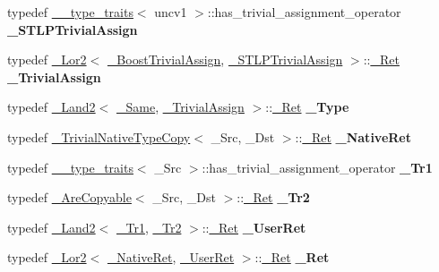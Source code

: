 \begin{DoxyCompactItemize}
typedef \hyperlink{struct____type__traits}{\+\_\+\+\_\+type\+\_\+traits}$<$ uncv1 $>$\+::has\+\_\+trivial\+\_\+assignment\+\_\+operator {\bfseries \+\_\+\+S\+T\+L\+P\+Trivial\+Assign}
\item 
\mbox{\label{struct___trivial_copy_abb68b8d834c50eb203aee02115c37900}} 
typedef \hyperlink{struct___lor2}{\+\_\+\+Lor2}$<$ \hyperlink{struct____true__type}{\+\_\+\+Boost\+Trivial\+Assign}, \hyperlink{struct____true__type}{\+\_\+\+S\+T\+L\+P\+Trivial\+Assign} $>$\+::\hyperlink{struct____true__type}{\+\_\+\+Ret} {\bfseries \+\_\+\+Trivial\+Assign}
\item 
\mbox{\label{struct___trivial_copy_a6498a805c926a4de0faeb5d1ac150d54}} 
typedef \hyperlink{struct___land2}{\+\_\+\+Land2}$<$ \hyperlink{struct____true__type}{\+\_\+\+Same}, \hyperlink{struct____true__type}{\+\_\+\+Trivial\+Assign} $>$\+::\hyperlink{struct____true__type}{\+\_\+\+Ret} {\bfseries \+\_\+\+Type}
\item 
\mbox{\label{struct___trivial_copy_a161dac65b6239c7d7a841e1f3ad0c202}} 
typedef \hyperlink{struct___trivial_native_type_copy}{\+\_\+\+Trivial\+Native\+Type\+Copy}$<$ \+\_\+\+Src, \+\_\+\+Dst $>$\+::\hyperlink{struct____true__type}{\+\_\+\+Ret} {\bfseries \+\_\+\+Native\+Ret}
\item 
\mbox{\label{struct___trivial_copy_a15e6be6c144ddd986220905393713710}} 
typedef \hyperlink{struct____type__traits}{\+\_\+\+\_\+type\+\_\+traits}$<$ \+\_\+\+Src $>$\+::has\+\_\+trivial\+\_\+assignment\+\_\+operator {\bfseries \+\_\+\+Tr1}
\item 
\mbox{\label{struct___trivial_copy_a33aea6b9cb9777e0024d62ab600c8107}} 
typedef \hyperlink{struct___are_copyable}{\+\_\+\+Are\+Copyable}$<$ \+\_\+\+Src, \+\_\+\+Dst $>$\+::\hyperlink{struct____true__type}{\+\_\+\+Ret} {\bfseries \+\_\+\+Tr2}
\item 
\mbox{\label{struct___trivial_copy_abbd630c4dedf27ff748bb3800dccc7bb}} 
typedef \hyperlink{struct___land2}{\+\_\+\+Land2}$<$ \hyperlink{struct____true__type}{\+\_\+\+Tr1}, \hyperlink{struct____true__type}{\+\_\+\+Tr2} $>$\+::\hyperlink{struct____true__type}{\+\_\+\+Ret} {\bfseries \+\_\+\+User\+Ret}
\item 
\mbox{\label{struct___trivial_copy_a8a6931aaf52ceff68d0eb164e1eaec7a}} 
typedef \hyperlink{struct___lor2}{\+\_\+\+Lor2}$<$ \hyperlink{struct____true__type}{\+\_\+\+Native\+Ret}, \hyperlink{struct____false__type}{\+\_\+\+User\+Ret} $>$\+::\hyperlink{struct____true__type}{\+\_\+\+Ret} {\bfseries \+\_\+\+Ret}
\end{DoxyCompactItemize}

